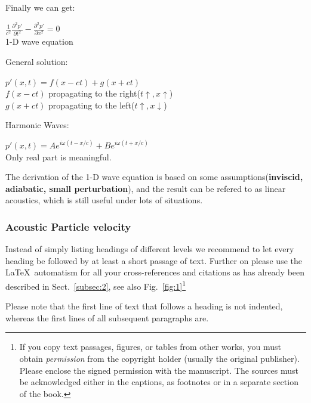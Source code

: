 \documentclass[graybox]{svmult}
\begin{document}
Finally we can get:
\begin{center}
    $ \frac{1}{c^2} \frac{\partial^2 p'}{\partial t^2} - \frac{\partial^2 p'}{\partial x^2} = 0 $ \\
    1-D wave equation
\end{center}


General solution:
\begin{center}
    $ p'(x,t) = f(x-ct) +g(x+ct) $ \\
    $ f(x-ct) $ propagating to the right($ t\uparrow, x\uparrow$) \\
    $ g(x+ct) $ propagating to the left($ t\uparrow, x\downarrow $)
\end{center}

Harmonic Waves:
\begin{center}
    $ p'(x,t) = Ae^{i\omega (t-x/c)} + Be^{i\omega (t+x/c)}$ \\
    Only real part is meaningful.
\end{center}


The derivation of the 1-D wave equation is based on some assumptions(\textbf{inviscid, adiabatic, small perturbation}), and the result can be refered to as linear acoustics, which is still useful under lots of situations.

\subsubsection{Acoustic Particle velocity}
Instead of simply listing headings of different levels we recommend to let every heading be followed by at least a short passage of text.  Further on please use the \LaTeX\ automatism for all your cross-references and citations as has already been described in Sect.~\ref{subsec:2}, see also Fig.~\ref{fig:1}\footnote{If you copy text passages, figures, or tables from other works, you must obtain \textit{permission} from the copyright holder (usually the original publisher). Please enclose the signed permission with the manuscript. The sources must be acknowledged either in the captions, as footnotes or in a separate section of the book.}

Please note that the first line of text that follows a heading is not indented, whereas the first lines of all subsequent paragraphs are.
\end{document}
